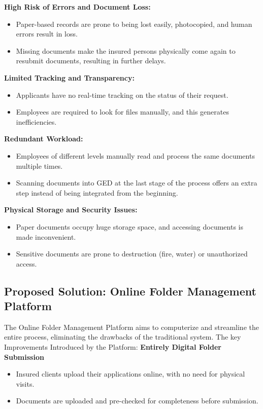 \textbf{ High Risk of Errors and Document Loss:}
\begin{itemize}
    \item Paper-based records are prone to being lost easily, photocopied, and human errors result in loss.
    \item Missing documents make the insured persons physically come again to resubmit documents, resulting in further delays.
\end{itemize}

\textbf{ Limited Tracking and Transparency:}
\begin{itemize}
    \item Applicants have no real-time tracking on the status of their request.
    \item Employees are required to look for files manually, and this generates inefficiencies.
\end{itemize}

\textbf{ Redundant Workload:}
\begin{itemize}
    \item Employees of different levels manually read and process the same documents multiple times.
    \item Scanning documents into GED at the last stage of the process offers an extra step instead of being integrated from the beginning.
\end{itemize}

\textbf{ Physical Storage and Security Issues:}
\begin{itemize}
    \item Paper documents occupy huge storage space, and accessing documents is made inconvenient.
    \item Sensitive documents are prone to destruction (fire, water) or unauthorized access.
\end{itemize}

\subsection{Proposed Solution: Online Folder Management Platform}
The Online Folder Management Platform aims to computerize and streamline the entire process, eliminating the drawbacks of the traditional system. The key Improvements Introduced by the Platform:
\clearpage
\textbf{ Entirely Digital Folder Submission}
\begin{itemize}
    \item Insured clients upload their applications online, with no need for physical visits.
    \item Documents are uploaded and pre-checked for completeness before submission.
\end{itemize}

